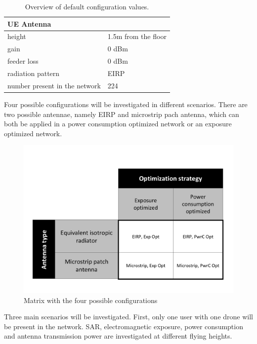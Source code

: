 \documentclass[twocolumn]{phdsymp} %
\begin{document}
\begin{table}[!htb]
\begin{tabular}[t]{ll}
        \hline
        \multicolumn{2}{l}{\textbf{UE Antenna}} \\
        \hline 
        \hspace{3mm} height                     & 1.5m from the floor       \\ 
        \hspace{3mm} gain                      & 0 dBm   \\ 
        \hspace{3mm} feeder loss               & 0 dBm   \\ 
        \hspace{3mm} radiation pattern         & EIRP  \\
        \hspace{3mm} number present in the network         & 224  \\
        \toprule
\end{tabular}
\caption{Overview of default configuration values.}
\end{table}


Four possible configurations  will be investigated in different scenarios. There are two possible antennae, namely EIRP 
and microstrip pach antenna, which can both be applied in a power consumption optimized network or an exposure optimized network.

\begin{figure}[h!]
  \includegraphics[width=\linewidth]{fourCasesMatrix.pdf}
  \caption{Matrix with the four possible configurations}
  \label{fig:fourCasesMatrix}
\end{figure}

Three main scenarios will be investigated. 
First, only one user with one drone will be present in the network. SAR, electromagnetic exposure, power consumption 
and antenna transmission power are investigated at different flying heights.
\end{document}
